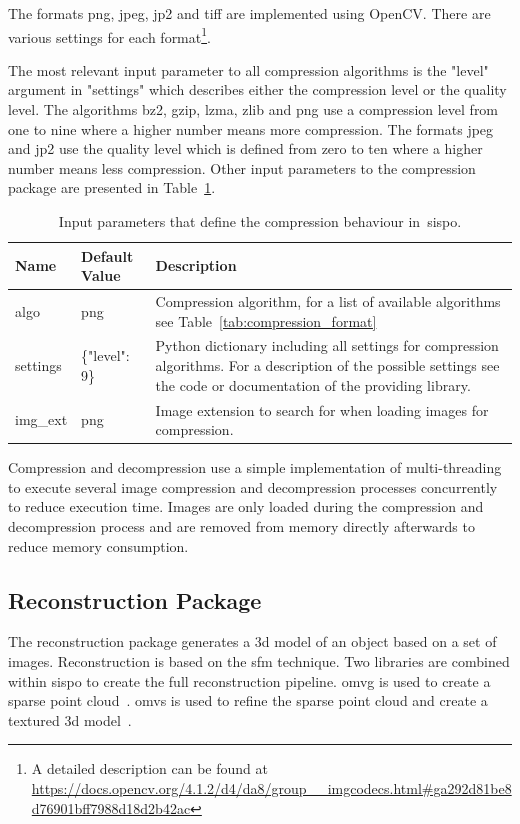 The formats \gls{png}, \gls{jpeg}, \gls{jp2} and \gls{tiff} are implemented using OpenCV. There are various settings for each format\footnote{A detailed description can be found at \url{https://docs.opencv.org/4.1.2/d4/da8/group__imgcodecs.html\#ga292d81be8d76901bff7988d18d2b42ac}}.

The most relevant input parameter to all compression algorithms is the "level" argument in "settings" which describes either the compression level or the quality level. The algorithms bz2, gzip, \gls{lzma}, zlib and \gls{png} use a compression level from one to nine where a higher number means more compression. The formats \gls{jpeg} and \gls{jp2} use the quality level which is defined from zero to ten where a higher number means less compression. Other input parameters to the compression package are presented in Table~\ref{tab:compression_settings}.

\begin{table}[htb]
    \centering
    \caption{Input parameters that define the compression behaviour in~\gls{sispo}.}
    \label{tab:compression_settings}
    \begin{tabular}{p{}|p{}|p{}}
        \textbf{Name} & \textbf{Default Value} & \textbf{Description} \\ \hline
        algo    & \gls{png}  & Compression algorithm, for a list of available algorithms see Table~\ref{tab:compression_format}\\
        settings & \{"level": 9\} & Python dictionary including all settings for compression algorithms. For a description of the possible settings see the code or documentation of the providing library. \\
        img\_ext    & \gls{png} & Image extension to search for when loading images for compression. 
    \end{tabular}
\end{table}

Compression and decompression use a simple implementation of multi-threading to execute several image compression and decompression processes concurrently to reduce execution time. Images are only loaded during the compression and decompression process and are removed from memory directly afterwards to reduce memory consumption.

\subsection{Reconstruction Package}
The reconstruction package generates a \gls{3d} model of an object based on a set of images. Reconstruction is based on the \gls{sfm} technique. Two libraries are combined within \gls{sispo} to create the full reconstruction pipeline. \Gls{omvg} is used to create a sparse point cloud~\cite{openMVG}. \Gls{omvs} is used to refine the sparse point cloud and create a textured \gls{3d} model~\cite{openMVS}. 

